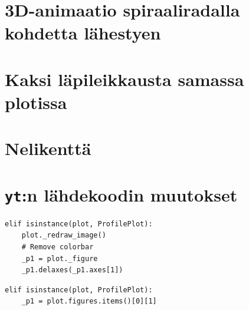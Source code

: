 \documentclass[12pt,a4paper]{article}
\newcommand{\yt}{\texttt{yt}}
\begin{document}


\appendix
%
\section{3D-animaatio spiraaliradalla kohdetta lä\-hes\-tyen} \label{koodi:volume-spiraali}

\newpage

\section{Kaksi läpileikkausta samassa plotissa} \label{koodi:multiplot-simppeli}

\newpage

\section{Nelikenttä} \label{koodi:multiplot-nelikentta}

\newpage


\section{\yt:n lähdekoodin muutokset} \label{liite:muutokset}

\begin{minipage}{\textwidth}
\begin{lstlisting}
elif isinstance(plot, ProfilePlot):
	plot._redraw_image()
	# Remove colorbar
	_p1 = plot._figure
	_p1.delaxes(_p1.axes[1])
\end{lstlisting}
\end{minipage}

\begin{minipage}{\textwidth}
\begin{lstlisting}
elif isinstance(plot, ProfilePlot):
	_p1 = plot.figures.items()[0][1]
\end{lstlisting}
\end{minipage}


\end{document}
